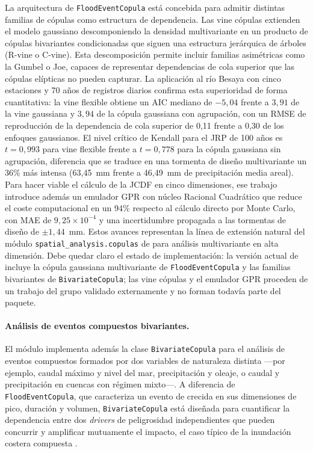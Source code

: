 La arquitectura de \texttt{FloodEventCopula} está concebida para admitir distintas familias de cópulas como estructura de dependencia. Las vine cópulas \parencite{aas2009vines} extienden el modelo gaussiano descomponiendo la densidad multivariante en un producto de cópulas bivariantes condicionadas que siguen una estructura jerárquica de árboles (R-vine o C-vine). Esta descomposición permite incluir familias asimétricas como la Gumbel o Joe, capaces de representar dependencias de cola superior que las cópulas elípticas no pueden capturar. La aplicación al río Besaya con cinco estaciones y 70 años de registros diarios \parencite{urrea2026vine} confirma esta superioridad de forma cuantitativa: la vine flexible obtiene un AIC mediano de $-5{,}04$ frente a $3{,}91$ de la vine gaussiana y $3{,}94$ de la cópula gaussiana con agrupación, con un RMSE de reproducción de la dependencia de cola superior de 0,11 frente a 0,30 de los enfoques gaussianos. El nivel crítico de Kendall para el JRP de 100 años es $t = 0{,}993$ para vine flexible frente a $t = 0{,}778$ para la cópula gaussiana sin agrupación, diferencia que se traduce en una tormenta de diseño multivariante un 36\% más intensa (63,45~mm frente a 46,49~mm de precipitación media areal). Para hacer viable el cálculo de la JCDF en cinco dimensiones, ese trabajo introduce además un emulador GPR con núcleo Racional Cuadrático que reduce el coste computacional en un 94\% respecto al cálculo directo por Monte Carlo, con MAE de $9{,}25 \times 10^{-4}$ y una incertidumbre propagada a las tormentas de diseño de $\pm 1{,}44$~mm. Estos avances representan la línea de extensión natural del módulo \texttt{spatial\_analysis.copulas} de \hydra para análisis multivariante en alta dimensión. Debe quedar claro el estado de implementación: la versión actual de \pyhydra incluye la cópula gaussiana multivariante de \texttt{FloodEventCopula} y las familias bivariantes de \texttt{BivariateCopula}; las vine cópulas y el emulador GPR proceden de un trabajo del grupo validado externamente \parencite{urrea2026vine} y no forman todavía parte del paquete.

\paragraph{Análisis de eventos compuestos bivariantes.}
El módulo implementa además la clase \texttt{BivariateCopula} para el análisis de eventos compuestos formados por dos variables de naturaleza distinta ---por ejemplo, caudal máximo y nivel del mar, precipitación y oleaje, o caudal y precipitación en cuencas con régimen mixto---. A diferencia de \texttt{FloodEventCopula}, que caracteriza un evento de crecida en sus dimensiones de pico, duración y volumen, \texttt{BivariateCopula} está diseñada para cuantificar la dependencia entre dos \emph{drivers} de peligrosidad independientes que pueden concurrir y amplificar mutuamente el impacto, el caso típico de la inundación costera compuesta \parencite{zscheischler2020compound}.


